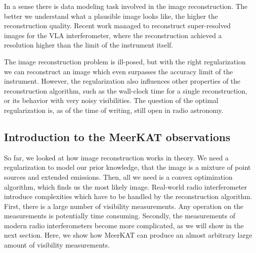 In a sense there is data modeling task involved in the image reconstruction. The better we understand what a plausible image looks like, the higher the reconstruction quality. Recent work managed to reconstruct super-resolved images for the VLA interferometer\cite{dabbech2018cygnus}, where the reconstruction achieved a resolution higher than the limit of the instrument itself.

The image reconstruction problem is ill-posed, but with the right regularization we can reconstruct an image which even surpasses the accuracy limit of the instrument. However, the regularization also influences other properties of the reconstruction algorithm, such as the wall-clock time for a single reconstruction, or its behavior with very noisy visibilities. The question of the optimal regularization is, as of the time of writing, still open in radio astronomy.


\subsection{Introduction to the MeerKAT observations}
So far, we looked at how image reconstruction works in theory. We need a regularization to model our prior knowledge, that the image is a mixture of point sources and extended emissions. Then, all we need is a convex optimization algorithm, which finds us the most likely image. Real-world radio interferometer introduce complexities which have to be handled by the reconstruction algorithm. First, there is a large number of visibility measurements. Any operation on the measurements is potentially time consuming. Secondly, the measurements of modern radio interferometers become more complicated, as we will show in the next section. Here, we show how MeerKAT can produce an almost arbitrary large amount of visibility measurements.

